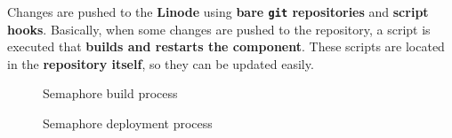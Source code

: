 \documentclass[a4paper,11pt,titlepage,abstract,numbers=noenddot,automark,mnsy,intlimits,rgb,dvipsnames]{report}
\begin{document}
Changes are pushed to the \textbf{Linode} using \textbf{bare \texttt{git} repositories} and \textbf{script hooks}. Basically,
when some changes are pushed to the repository, a script is executed that \textbf{builds and restarts the component}.
These scripts are located in the \textbf{repository itself}, so they can be updated easily.
\begin{figure}[H]
\noindent{}
\caption{Semaphore build process}
\label{build_process}
\end{figure}
\begin{figure}[H]
\noindent{}
\caption{Semaphore deployment process}
\label{deployment_process}
\end{figure}
\clearpage
\end{document}
